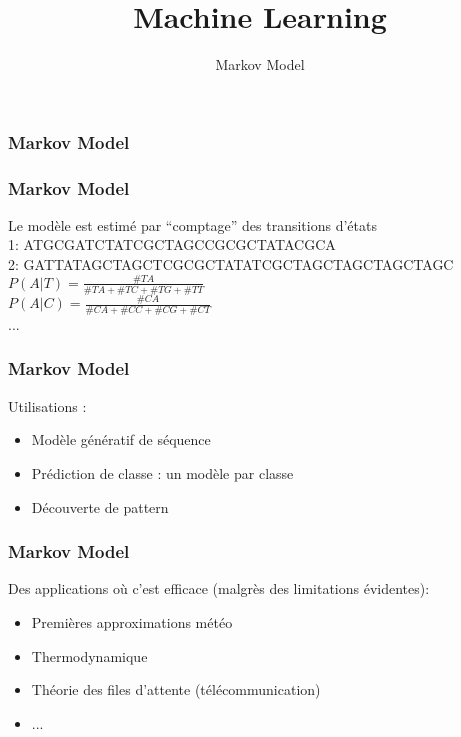 \documentclass{formation}
\title{Machine Learning}
\subtitle{Markov Model}
\begin{document}
\maketitle

\begin{frame}
  \frametitle{Markov Model}
\end{frame}

\begin{frame}
  \frametitle{Markov Model}
  Le modèle est estimé par ``comptage'' des transitions d'états \\
  1: ATGCGATCTATCGCTAGCCGCGCTATACGCA \\
  2: GATTATAGCTAGCTCGCGCTATATCGCTAGCTAGCTAGCTAGC \\
  $P(A|T) = \frac{\#TA}{\#TA+\#TC+\#TG+\#TT}$ \\
  $P(A|C) = \frac{\#CA}{\#CA+\#CC+\#CG+\#CT}$ \\
  ...
\end{frame}

\begin{frame}
  \frametitle{Markov Model}
  Utilisations :
  \begin{itemize}
  \item Modèle génératif de séquence
  \item Prédiction de classe : un modèle par classe
  \item Découverte de pattern
  \end{itemize}
\end{frame}

\begin{frame}
  \frametitle{Markov Model}
  Des applications où c'est efficace (malgrès des limitations évidentes):
  \begin{itemize}
  \item Premières approximations météo
  \item Thermodynamique
  \item Théorie des files d'attente (télécommunication)
  \item ...
  \end{itemize}
\end{frame}
\end{document}
